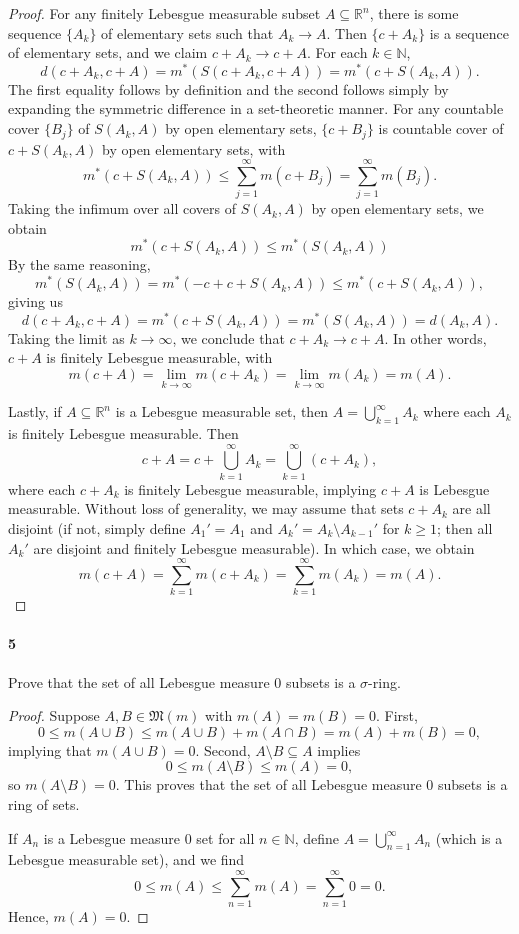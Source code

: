 \documentclass[12pt]{article}
\newenvironment{fullbox}{\begin{lrbox}{\savefullbox}\begin{minipage}{\dimexpr\textwidth-2\fboxsep\relax}}{\end{minipage}\end{lrbox}\begin{center}\framebox[\textwidth]{\usebox{\savefullbox}}\end{center}}
\newenvironment{pbox}[1][]{\begin{fullbox}\ifx#1\empty\else\paragraph{#1}\fi}{\end{fullbox}}
\newcommand{\N}{\mathbb{N}}
\newcommand{\R}{\mathbb{R}}
\newcommand{\<}{\langle}
\renewcommand{\>}{\rangle}
\newcommand{\MM}{\mathfrak{M}}
\begin{document}
\begin{proof}
    For any finitely Lebesgue measurable subset $A \subseteq \R^n$, there is some sequence $\{A_k\}$ of elementary sets such that $A_k \to A$. Then $\{c + A_k\}$ is a sequence of elementary sets, and we claim $c + A_k \to c + A$. For each $k \in \N$,
    \[
        d(c + A_k, c + A) = m^*(S(c + A_k, c + A)) = m^*(c + S(A_k, A)).
    \]
    The first equality follows by definition and the second follows simply by expanding the symmetric difference in a set-theoretic manner. For any countable cover $\{B_j\}$ of $S(A_k, A)$ by open elementary sets, $\{c + B_j\}$ is countable cover of $c + S(A_k, A)$ by open elementary sets, with
    \[
        m^*(c + S(A_k, A)) \leq \sum_{j=1}^{\infty} m(c + B_j) = \sum_{j=1}^{\infty} m(B_j).
    \]
    Taking the infimum over all covers of $S(A_k, A)$ by open elementary sets, we obtain
    \[
        m^*(c + S(A_k, A)) \leq m^*(S(A_k, A))
    \]
    By the same reasoning,
    \[
        m^*(S(A_k, A)) = m^*(-c + c + S(A_k, A)) \leq m^*(c + S(A_k, A)),
    \]
    giving us
    \[
        d(c + A_k, c + A) = m^*(c + S(A_k, A)) = m^*(S(A_k, A)) = d(A_k, A).
    \]
    Taking the limit as $k \to \infty$, we conclude that $c + A_k \to c + A$. In other words, $c + A$ is finitely Lebesgue measurable, with
    \[
        m(c + A) = \lim_{k \to \infty} m(c + A_k) = \lim_{k \to \infty} m(A_k) = m(A).
    \]

    Lastly, if $A \subseteq \R^n$ is a Lebesgue measurable set, then $A = \bigcup_{k=1}^{\infty} A_k$ where each $A_k$ is finitely Lebesgue measurable. Then
    \[
        c + A = c + \bigcup_{k=1}^{\infty} A_k = \bigcup_{k=1}^{\infty} (c + A_k),
    \]
    where each $c + A_k$ is finitely Lebesgue measurable, implying $c + A$ is Lebesgue measurable. Without loss of generality, we may assume that sets $c + A_k$ are all disjoint (if not, simply define $A_1' = A_1$ and $A_k' = A_k \setminus A_{k-1}'$ for $k \geq 1$; then all $A_k'$ are disjoint and finitely Lebesgue measurable). In which case, we obtain
    \[
        m(c + A) = \sum_{k=1}^{\infty} m(c + A_k) = \sum_{k=1}^{\infty} m(A_k) = m(A).
    \]


\end{proof}



\newpage
\begin{pbox}[5]
    Prove that the set of all Lebesgue measure $0$ subsets is a $\sigma$-ring.
\end{pbox}

\begin{proof}
    Suppose $A, B \in \MM(m)$ with $m(A) = m(B) = 0$. First,
    \[
        0 \leq m(A \cup B) \leq m(A \cup B) + m(A \cap B) = m(A) + m(B) = 0,
    \]
    implying that $m(A \cup B) = 0$. Second, $A \setminus B \subseteq A$ implies
    \[
        0 \leq m(A \setminus B) \leq m(A) = 0,
    \]
    so $m(A \setminus B) = 0$. This proves that the set of all Lebesgue measure $0$ subsets is a ring of sets.

    If $A_n$ is a Lebesgue measure $0$ set for all $n \in \N$, define $A = \bigcup_{n=1}^{\infty} A_n$ (which is a Lebesgue measurable set), and we find
    \[
        0 \leq m(A) \leq \sum_{n=1}^{\infty} m(A) = \sum_{n=1}^{\infty} 0 = 0.
    \]
    Hence, $m(A) = 0$.

\end{proof}
\end{document}
